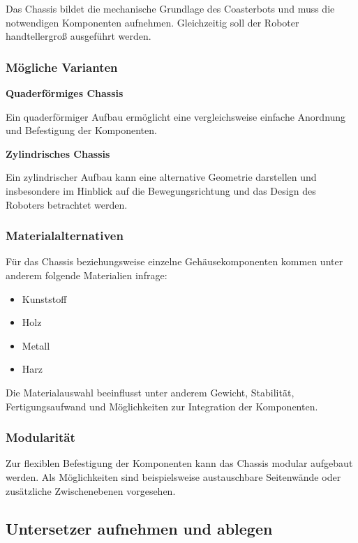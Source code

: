 Das Chassis bildet die mechanische Grundlage des Coasterbots und muss
die notwendigen Komponenten aufnehmen. Gleichzeitig soll der Roboter
handtellergroß ausgeführt werden.

\subsubsection{Mögliche Varianten}\label{muxf6gliche-varianten}

\textbf{Quaderförmiges Chassis}

Ein quaderförmiger Aufbau ermöglicht eine vergleichsweise einfache
Anordnung und Befestigung der Komponenten.

\textbf{Zylindrisches Chassis}

Ein zylindrischer Aufbau kann eine alternative Geometrie darstellen und
insbesondere im Hinblick auf die Bewegungsrichtung und das Design des
Roboters betrachtet werden.

\subsubsection{Materialalternativen}\label{materialalternativen}

Für das Chassis beziehungsweise einzelne Gehäusekomponenten kommen unter
anderem folgende Materialien infrage:

\begin{itemize}
\tightlist
\item
  Kunststoff
\item
  Holz
\item
  Metall
\item
  Harz
\end{itemize}

Die Materialauswahl beeinflusst unter anderem Gewicht, Stabilität,
Fertigungsaufwand und Möglichkeiten zur Integration der Komponenten.

\subsubsection{Modularität}\label{modularituxe4t}

Zur flexiblen Befestigung der Komponenten kann das Chassis modular
aufgebaut werden. Als Möglichkeiten sind beispielsweise austauschbare
Seitenwände oder zusätzliche Zwischenebenen vorgesehen.

\subsection{Untersetzer aufnehmen und
ablegen}\label{untersetzer-aufnehmen-und-ablegen}

